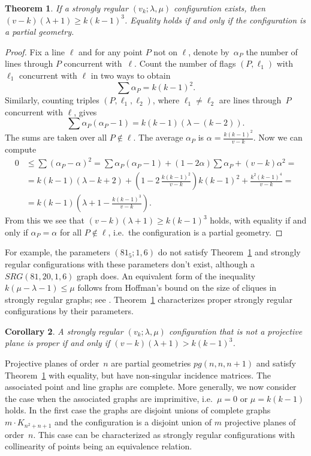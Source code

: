 \documentclass[12pt, reqno]{amsart}
\newtheorem{theorem}{Theorem}[section]
\newtheorem{corollary}[theorem]{Corollary}
\begin{document}
\begin{theorem}\label{cliquecond}
If a strongly regular $(v_k;\lambda,\mu)$ configuration exists, then
$(v-k)(\lambda+1)\ge k(k-1)^3$. Equality holds if and only if the
configuration is a partial geometry.
\end{theorem}

\begin{proof}
Fix a line $\ell$ and for any point $P$ not on
$\ell$, denote by~$\alpha_P$ the number of lines through $P$ concurrent with~$\ell$.
Count the number of flags $(P,\ell_1)$ with $\ell_1$ concurrent with $\ell$ in
two ways to obtain
$$\sum \alpha_P = k(k-1)^2.$$
Similarly, counting triples $(P,\ell_1,\ell_2)$, where $\ell_1\neq\ell_2$
are lines through~$P$ concurrent with $\ell$, gives
$$\sum \alpha_P(\alpha_P-1) = k(k-1)(\lambda-(k-2)).$$
The sums are taken over all $P\not\in \ell$. The average
$\alpha_P$ is $\alpha= \frac{k(k-1)^2}{v-k}$. Now we can compute
\begin{align*}
0 &\le \sum (\alpha_P-\alpha)^2 =  \sum \alpha_P(\alpha_P-1) +
(1-2\alpha) \sum \alpha_P + (v-k)
\alpha^2 = \\
 & = k(k-1)(\lambda-k+2) + \left(1-2\,\frac{k(k-1)^2}{v-k}\right)k(k-1)^2 +
 \frac{k^2(k-1)^4}{v-k} = \\
 & = k(k-1)\left( \lambda+1 - \frac{k(k-1)^3}{v-k}\right).
\end{align*}
From this we see that $(v-k)(\lambda+1)\ge k(k-1)^3$ holds, with equality
if and only if $\alpha_P=\alpha$ for all $P\not\in \ell$, i.e.\
the configuration is a partial geometry.
\end{proof}

For example, the parameters $(81_5;1,6)$ do not satisfy
Theorem~\ref{cliquecond} and strongly regular configurations with these parameters
don't exist, although a $SRG(81,20,1,6)$ graph does. An equivalent form
of the inequality $k(\mu-\lambda-1)\le \mu$ follows from Hoffman's bound
on the size of cliques in strongly regular graphs; see \cite[Section
1.3]{BCN89}. Theorem~\ref{cliquecond} characterizes proper
strongly regular configurations by their parameters.

\begin{corollary}
A strongly regular $(v_k;\lambda,\mu)$ configuration that is not a projective plane is proper if and only if
$(v-k)(\lambda+1) > k(k-1)^3$.
\end{corollary}

Projective planes of order~$n$ are partial geometries $pg(n,n,n+1)$ and satisfy
Theorem~\ref{cliquecond} with equality, but have non-singular incidence matrices. The associated
point and line graphs are complete. More generally, we now consider the
case when the associated graphs are imprimitive, i.e.\ $\mu=0$ or $\mu=k(k-1)$ holds. In
the first case the graphs are disjoint unions of complete graphs $m\cdot K_{n^2+n+1}$
and the configuration is a disjoint union of $m$ projective planes of order~$n$. This case
can be characterized as strongly regular configurations with collinearity of points being
an equivalence relation.
\end{document}
